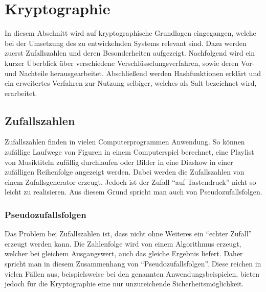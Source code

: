 \section{Kryptographie}
\label{kryptographie}
In diesem Abschnitt wird auf kryptographische Grundlagen eingegangen, welche bei der Umsetzung des zu entwickelnden Systems relevant sind.
Dazu werden zuerst Zufallszahlen und deren Besonderheiten aufgezeigt.
Nachfolgend wird ein kurzer Überblick über verschiedene Verschlüsselungsverfahren, sowie deren Vor- und Nachteile herausgearbeitet.
Abschließend werden Hashfunktionen erklärt und ein erweitertes Verfahren zur Nutzung selbiger, welches als Salt bezeichnet wird, erarbeitet.

\subsection{Zufallszahlen}
\label{zufallszahlen}
Zufallszahlen finden in vielen Computerprogrammen Anwendung.
So können zufällige Laufwege von Figuren in einem Computerspiel berechnet, eine Playlist von Musiktiteln zufällig durchlaufen oder Bilder in eine Diashow in einer zufälligen Reihenfolge angezeigt werden\cite[vgl.][Seite 62]{ling02}.
Dabei werden die Zufallszahlen von einem Zufallsgenerator erzeugt.
Jedoch ist der Zufall "`auf Tastendruck"' nicht so leicht zu realisieren\cite[vgl.][Seite 62]{ling02}.
Aus diesem Grund spricht man auch von Pseudozufallsfolgen.

\subsubsection{Pseudozufallsfolgen}
\label{pseudozufallsfolgen}
Das Problem bei Zufallszahlen ist, dass nicht ohne Weiteres ein "`echter Zufall"' erzeugt werden kann\cite[vgl.][Seite 62]{ling02}.
Die Zahlenfolge wird von einem Algorithmus erzeugt, welcher bei gleichem Ausgangswert, auch das gleiche Ergebnis liefert\cite[vgl.][Seite 62]{ling02}.
Daher spricht man in diesem Zusammenhang von "`Pseudozufallsfolgen"'.
Diese reichen in vielen Fällen aus, beispielsweise bei den genannten Anwendungsbeispielen, bieten jedoch für die Kryptographie eine nur unzureichende Sicherheitsmöglichkeit\cite[vgl.][Seite 62]{ling02}.

